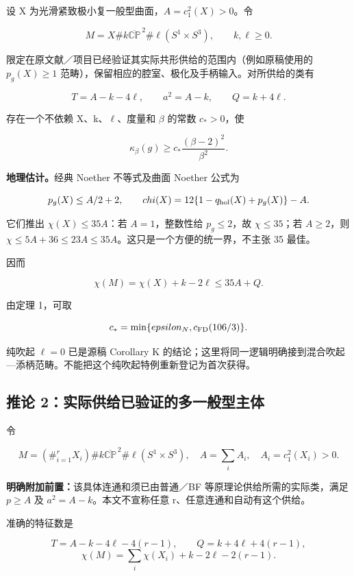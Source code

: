 \documentclass[UTF8,11pt,openany,oneside,fontset=none]{ctexbook}
\begin{document}
设 X 为光滑紧致极小复一般型曲面，\(A=c_1^2(X)>0\)。令

\[
M=X\#k\overline{\mathbb{CP}}^{\,2}
\#\ell(S^1\times S^3),\qquad k,\ell\ge0.
\]

限定在原文献／项目已经验证其实际共形供给的范围内（例如原稿使用的 \(p_g(X)\ge1\) 范畴），保留相应的腔室、极化及手柄输入。对所供给的类有

\[
T=A-k-4\ell,\qquad a^2=A-k,\qquad Q=k+4\ell.
\]

存在一个不依赖 X、k、\(\ell\)、度量和 \(\beta\) 的常数 \(c_*>0\)，使

\[
\boxed{\kappa_\beta(g)\ge
c_*\frac{(\beta-2)^2}{\beta^2}.}
\tag{8.3}\label{eq:r8:3}
\]

\textbf{地理估计。}经典 Noether 不等式及曲面 Noether 公式为

\[
p_g(X)\le A/2+2,
\qquad
\chi(X)=12\{1-q_{\rm hol}(X)+p_g(X)\}-A.
\]

它们推出 \(\chi(X)\le35A\)：若 \(A=1\)，整数性给 \(p_g\le2\)，故 \(\chi\le35\)；若 \(A\ge2\)，则 \(\chi\le5A+36\le23A\le35A\)。这只是一个方便的统一界，不主张 35 最佳。

因而

\[
\chi(M)=\chi(X)+k-2\ell\le35A+Q.
\]

由定理 1，可取

\[
c_* =\min\{\varepsilon_N,c_{\rm FD}(106/3)\}.
\]

纯吹起 \(\ell=0\) 已是源稿 Corollary K 的结论；这里将同一逻辑明确接到混合吹起---添柄范畴。不能把这个纯吹起特例重新登记为首次获得。

\subsection{推论 2：实际供给已验证的多一般型主体}\label{ch8:ux63a8ux8bba-2ux5b9eux9645ux4f9bux7ed9ux5df2ux9a8cux8bc1ux7684ux591aux4e00ux822cux578bux4e3bux4f53}

\cite{BF}

令

\[
M=(\#_{i=1}^{r}X_i)\#k\overline{\mathbb{CP}}^{\,2}
\#\ell(S^1\times S^3),
\quad A=\sum_i A_i,\quad A_i=c_1^2(X_i)>0.
\]

\textbf{明确附加前置：}该具体连通和须已由普通／BF 等原理论供给所需的实际类，满足 \(p\ge A\) 及 \(a^2=A-k\)。本文不宣称任意 r、任意连通和自动有这个供给。

准确的特征数是

\[
T=A-k-4\ell-4(r-1),\qquad
Q=k+4\ell+4(r-1),
\] \[
\chi(M)=\sum_i\chi(X_i)+k-2\ell-2(r-1).
\]
\end{document}
